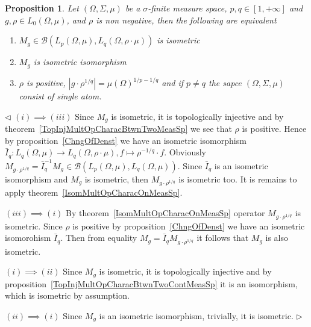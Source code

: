 \documentclass[12pt]{article}
\newtheorem{proposition}[theorem]{Proposition}
\newenvironment{proof}{\par $\triangleleft$}{$\triangleright$}
\begin{document}
\begin{proposition}\label{IsomMultOpCharacBtwnTwoContMeasSp}
    Let $(\Omega,\Sigma,\mu)$ be a $\sigma$-finite measure space,
    $p,q\in[1,+\infty]$ and $g,\rho\in L_0(\Omega,\mu)$, and $\rho$ is non
    negative, then the following are equivalent
    \begin{enumerate}[label = (\roman*)]
        \item $M_g\in\mathcal{B}(L_p(\Omega,\mu), L_q(\Omega,\rho\cdot\mu))$
              is isometric

        \item $M_g$ is isometric isomorphism

        \item $\rho$ is positive, $|g\cdot \rho^{1/q}|={\mu(\Omega)}^{1/p-1/q}$
              and if $p\neq q$ the sapce $(\Omega,\Sigma,\mu)$ consist of single atom.
    \end{enumerate}
\end{proposition}
\begin{proof} $(i)\implies (iii)$ Since $M_g$ is isometric, it is topologically
    injective and by theorem~\ref{TopInjMultOpCharacBtwnTwoMeasSp} we see that
    $\rho$ is positive. Hence by proposition~\ref{ChngOfDenst} we have an
    isometric isomorphism
    $\bar{I}_q:L_q(\Omega,\mu)\to L_q(\Omega,\rho\cdot\mu),
        f\mapsto \rho^{-1/q}\cdot f$. Obviously
    $M_{g\cdot\rho^{1/q}}
        =\bar{I}_q^{-1} M_g\in\mathcal{B}(L_p(\Omega,\mu),L_q(\Omega,\mu))$. Since
    $\bar{I}_q$ is an isometric isomorphism and $M_g$ is isometric, then
    $M_{g\cdot \rho^{1/q}}$ is isometric too. It is remains to apply
    theorem~\ref{IsomMultOpCharacOnMeasSp}.

    $(iii)\implies (i)$ By theorem~\ref{IsomMultOpCharacOnMeasSp} operator
    $M_{g\cdot\rho^{1/q}}$ is isometric. Since $\rho$ is positive by
    proposition~\ref{ChngOfDenst} we have an isometric isomorohism $\bar{I}_q$.
    Then from equality $M_g=\bar{I}_q M_{g\cdot\rho^{1/q}}$ it follows
    that $M_g$ is also isometric.

    $(i)\implies (ii)$ Since $M_g$ is isometric, it is topologically
    injective and by proposition~\ref{TopInjMultOpCharacBtwnTwoContMeasSp} it
    is an isomorphism, which is isometric by assumption.

    $(ii)\implies (i)$ Since $M_g$ is an isometric isomorphism, trivially,
    it is isometric.
\end{proof}
\end{document}
